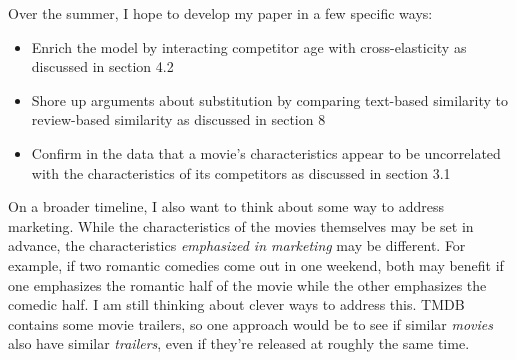 \documentclass{article}
\begin{document}
Over the summer, I hope to develop my paper in a few specific ways:
\begin{itemize}
    \item Enrich the model by interacting competitor age with cross-elasticity as discussed in section 4.2
    \item Shore up arguments about substitution by comparing text-based similarity to review-based similarity as discussed in section 8
    \item Confirm in the data that a movie's characteristics appear to be uncorrelated with the characteristics of its competitors as discussed in section 3.1
\end{itemize}

On a broader timeline, I also want to think about some way to address marketing. While the characteristics of the movies themselves may be set in advance, the characteristics \emph{emphasized in marketing} may be different. For example, if two romantic comedies come out in one weekend, both may benefit if one emphasizes the romantic half of the movie while the other emphasizes the comedic half. I am still thinking about clever ways to address this. TMDB contains some movie trailers, so one approach would be to see if similar \emph{movies} also have similar \emph{trailers}, even if they're released at roughly the same time. 

\printbibliography
\end{document}
